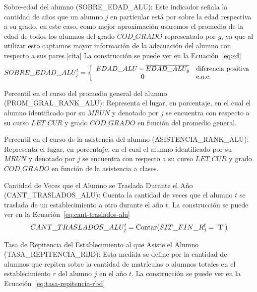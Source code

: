 \begin{longdescription}
\begin{longdescription}
              \item[Sobre-edad del alumno] (SOBRE\_EDAD\_ALU): Este indicador señala la cantidad de años que un alumno $j$ en particular está por sobre la edad respectiva a su grado, en este caso, como mejor aproximación usaremos el promedio de la edad de todos los alumnos del grado $COD\_GRADO$ representado por $g$, ya que al utilizar esto captamos mayor información de la adecuación del alumno con respecto a sus pares.[cita] La construcción se puede ver en la Ecuación~\ref{eq:sd}
              \begin{equation}
              \centering
              SOBRE\_EDAD\_ALU_{j}^{t} = \left\{
                \begin{array}{c l}
                 EDAD\_ALU -\overline{EDAD\_ALU_g} & \mbox{diferencia positiva}\\
                 0 & \mbox{e.o.c.}
                \end{array}
                \right.
                \label{eq:sd}
              \end{equation}
              \item[Percentil en el curso del promedio general del alumno] (PROM\_GRAL\_RANK\_ALU): Representa el lugar, en porcentaje, en el cual el alumno identificado por su $MRUN$ y denotado por $j$ se encuentra con respecto a su curso $LET\_CUR$ y grado $COD\_GRADO$ en función del promedio general.
              \item[Percentil en el curso de la asistencia del alumno](ASISTENCIA\_RANK\_ALU): Representa el lugar, en porcentaje, en el cual el alumno identificado por su $MRUN$ y denotado por $j$ se encuentra con respecto a su curso $LET\_CUR$ y grado $COD\_GRADO$ en función de la asistencia a clases.
              \item[Cantidad de Veces que el Alumno se Traslada Durante el Año](CANT\_TRASLADOS\_ALU):
             Cuenta la cantidad de veces que el alumno $t$ se traslada de un establecimiento a otro durante el año $t$. La construcción se puede ver en la Ecuación~\ref{eq:cant-traslados-alu}
            \begin{equation}
              \centering
              CANT\_TRASLADOS\_ALU_{j}^{t} = \mbox{Contar}(SIT\_FIN\_R_{j}^{t} = \mbox{'T'})
                \label{eq:cant-traslados-alu}
              \end{equation}
              \item[Tasa de Repitencia del Establecimiento al que Asiste el Alumno](TASA\_REPITENCIA\_RBD): Esta medida se define por la cantidad de alumnos que repiten sobre la cantidad de matrículas o alumnos totales en el establecimiento $r$ del alumno $j$ en el año $t$. La construcción se puede ver en la Ecuación~\ref{eq:tasa-repitencia-rbd}

\end{longdescription}
\end{longdescription}
